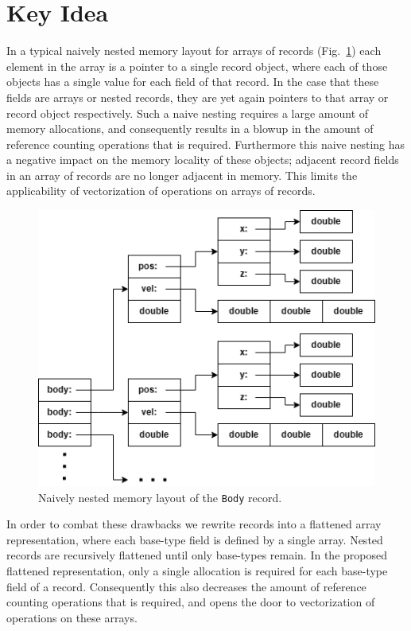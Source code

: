 
\section{Key Idea}\label{sec:key-idea}

In a typical naively nested memory layout for arrays of records (Fig.~\ref{fig:memory}) each element in the array is a pointer to a single record object, where each of those objects has a single value for each field of that record.
In the case that these fields are arrays or nested records, they are yet again pointers to that array or record object respectively.
Such a naive nesting requires a large amount of memory allocations, and consequently results in a blowup in the amount of reference counting operations that is required.
Furthermore this naive nesting has a negative impact on the memory locality of these objects;
adjacent record fields in an array of records are no longer adjacent in memory.
This limits the applicability of vectorization of operations on arrays of records.

\begin{figure}[ht!]
    \centering
    \includegraphics[width=0.7\linewidth]{images/records.png}
    \caption{Naively nested memory layout of the \texttt{Body} record.}
    \label{fig:memory}
\end{figure}

In order to combat these drawbacks we rewrite records into a flattened array representation, where each base-type field is defined by a single array.
Nested records are recursively flattened until only base-types remain.
In the proposed flattened representation, only a single allocation is required for each base-type field of a record.
Consequently this also decreases the amount of reference counting operations that is required, and opens the door to vectorization of operations on these arrays.

